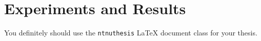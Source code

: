 \chapter{Experiments and Results}

You definitely should use the \texttt{ntnuthesis} \LaTeX{} document class for your thesis.
